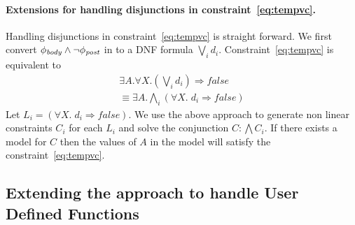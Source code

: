\documentclass[a4paper,10pt]{article}
\begin{document}
\paragraph{Extensions for handling disjunctions in constraint~\ref{eq:tempvc}.}

Handling disjunctions in constraint~\ref{eq:tempvc} is straight forward. We first
convert $\mathit{\phi_{body}} \wedge \neg \mathit{\phi_{post}}$ in to a DNF formula $\bigvee_i d_i$.
Constraint~\ref{eq:tempvc} is equivalent to 
%
\begin{align}
\exists A. \forall X. (\bigvee_i d_i) \Rightarrow false \\
\equiv \exists A. \bigwedge_i (\forall X. \; d_i \Rightarrow false)
\end{align}
%
Let $L_i =  (\forall X. \; d_i \Rightarrow false)$. We use the above approach to generate non linear constraints $C_i$ for each $L_i$ and solve the conjunction $C: \bigwedge C_i$.
If there exists a model for $C$ then the values of $A$ in the model will satisfy the 
constraint~\ref{eq:tempvc}.

\subsection{Extending the approach to handle User Defined Functions}




\end{document}
